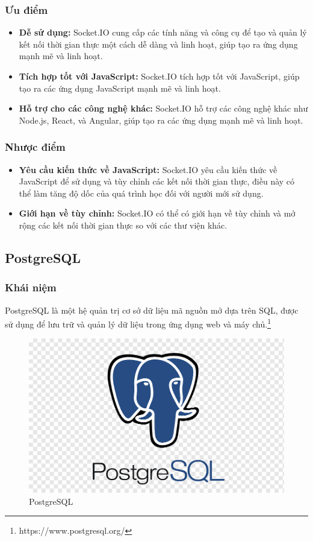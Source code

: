\subsubsection{Ưu điểm}
\begin{itemize}
  \item \textbf{Dễ sử dụng:} Socket.IO cung cấp các tính năng và công cụ để tạo và quản lý kết nối thời gian thực một cách dễ dàng và linh hoạt, giúp tạo ra ứng dụng mạnh mẽ và linh hoạt.
  \item \textbf{Tích hợp tốt với JavaScript:} Socket.IO tích hợp tốt với JavaScript, giúp tạo ra các ứng dụng JavaScript mạnh mẽ và linh hoạt.
  \item \textbf{Hỗ trợ cho các công nghệ khác:} Socket.IO hỗ trợ các công nghệ khác như Node.js, React, và Angular, giúp tạo ra các ứng dụng mạnh mẽ và linh hoạt.
\end{itemize}
\subsubsection{Nhược điểm}
\begin{itemize}
  \item \textbf{Yêu cầu kiến thức về JavaScript:} Socket.IO yêu cầu kiến thức về JavaScript để sử dụng và tùy chỉnh các kết nối thời gian thực, điều này có thể làm tăng độ dốc của quá trình học đối với người mới sử dụng.
  \item \textbf{Giới hạn về tùy chỉnh:} Socket.IO có thể có giới hạn về tùy chỉnh và mở rộng các kết nối thời gian thực so với các thư viện khác.
\end{itemize}
\subsection{PostgreSQL}
\subsubsection{Khái niệm}
\noindent PostgreSQL là một hệ quản trị cơ sở dữ liệu mã nguồn mở dựa trên SQL, được sử dụng để lưu trữ và quản lý dữ liệu trong ứng dụng web và máy chủ.\footnote{https://www.postgresql.org/}
\begin{figure}[H]
  \begin{center}
    \includegraphics[scale=0.3]{images/hieu/phuluc/postgresql.png}
    \caption{PostgreSQL}
  \end{center}
\end{figure}
